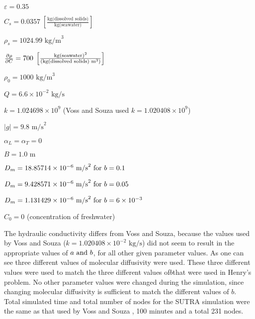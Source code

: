 $\varepsilon =0.35$

$C_{s} =0.0357 \; \left[\frac{ \text{kg(dissolved solids)} }{
\text{kg(seawater)} } \right]$

$\rho _{s} =1024.99 \text{ kg/m} ^{3} $ 

$\frac{\partial \rho}{\partial C} = 700 \; \left[\frac{ \text{kg} \left( \text{seawater}
\right)^{2} }{\left( \text{kg} \left( \text{dissolved solids} \right) \text{ m}
^{3} \right)} \right]$

$\rho _{0} =1000 \text{ kg/m} ^{3} $ 

$Q=6.6\times 10^{-2} \text{ kg/s} $

$k= 1.024698 \times 10^{9} $ (Voss and Souza used $k= 1.020408 \times 10^{9} $)

$\left|g\right| = 9.8 \text{ m/s} ^{2} $

$\alpha _{L} = \alpha _{T} =0 $ 

$B=1.0 \text{ m} $ 

$D_{m} =18.85714\times 10^{-6} \text{ m/s} ^{2} \text{ for } b = 0.1$

$D_{m} = 9.428571 \times 10^{-6} \text{ m/s} ^{2} \text{ for } b=0.05$

$D_{m} = 1.131429 \times 10^{-6} \text{ m/s} ^{2} \text{ for } b = 6\times 10^{-3} $

$C_{0} =0$ (concentration of freshwater)

The hydraulic conductivity differs from Voss and Souza, because the values used by Voss and Souza
($k=1.020408 \times 10^{-2} \text{ kg/s} $) did not seem to result in the appropriate values of $a
\text{ and } b$, for all other given parameter values. As one can see three different values of
molecular diffusivity were used. These three different values were used to match the three different
values of$b$that were used in Henry's problem. No other parameter values were changed during the
simulation, since changing molecular diffusivity is sufficient to match the different values of $b$.
Total simulated time and total number of nodes for the SUTRA simulation were the same as that used
by Voss and Souza \cite{Voss}, 100 minutes and a total 231 nodes.
